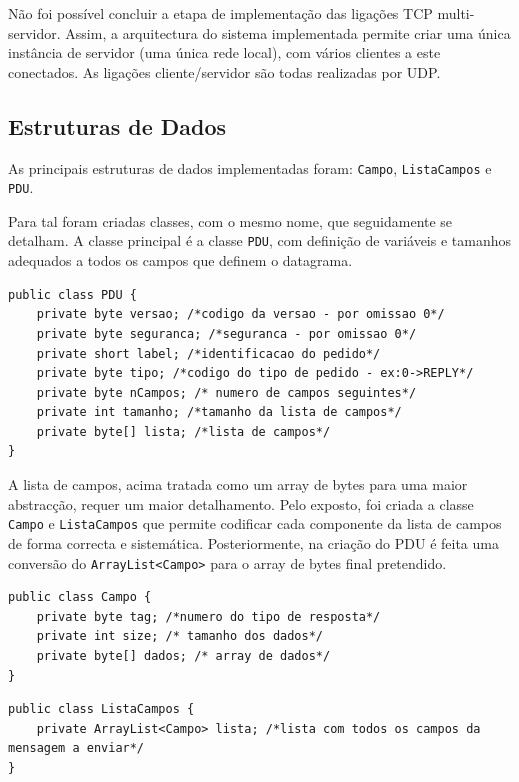 \documentclass{llncs}
\begin{document}
Não foi possível concluir a etapa de implementação das ligações TCP multi-servidor. 
Assim, a arquitectura do sistema implementada permite criar uma única instância de 
servidor (uma única rede local), com vários clientes a este conectados. As ligações 
cliente/servidor são todas realizadas por UDP.

\subsection{Estruturas de Dados}
As principais estruturas de dados implementadas foram: \verb!Campo!, \verb!ListaCampos! e
\verb!PDU!.

Para tal foram criadas classes, com o mesmo nome, que seguidamente se detalham. 
A classe principal é a classe \verb!PDU!, com definição de variáveis e tamanhos 
adequados a todos os campos que definem o datagrama.

\begin{lstlisting}[caption={Classe PDU}, label={code:PDU}]
public class PDU {
    private byte versao; /*codigo da versao - por omissao 0*/
    private byte seguranca; /*seguranca - por omissao 0*/
    private short label; /*identificacao do pedido*/
    private byte tipo; /*codigo do tipo de pedido - ex:0->REPLY*/
    private byte nCampos; /* numero de campos seguintes*/
    private int tamanho; /*tamanho da lista de campos*/
    private byte[] lista; /*lista de campos*/
}
\end{lstlisting}

A lista de campos, acima tratada como um array de bytes para uma maior abstracção, 
requer um maior detalhamento. Pelo exposto, foi criada a classe \verb!Campo! e
\verb!ListaCampos! que permite codificar cada componente da lista de campos de 
forma correcta e sistemática. Posteriormente, na criação do PDU é feita uma conversão 
do \verb!ArrayList<Campo>! para o array de bytes final pretendido.

\begin{lstlisting}[caption={Classe Campo}, label={code:campo}]
public class Campo {
    private byte tag; /*numero do tipo de resposta*/ 
    private int size; /* tamanho dos dados*/
    private byte[] dados; /* array de dados*/
}
\end{lstlisting}

\begin{lstlisting}[caption={Classe ListaCampos}, label={code:ListaCampos}]
public class ListaCampos {
    private ArrayList<Campo> lista; /*lista com todos os campos da mensagem a enviar*/
}
\end{lstlisting}
\end{document}
